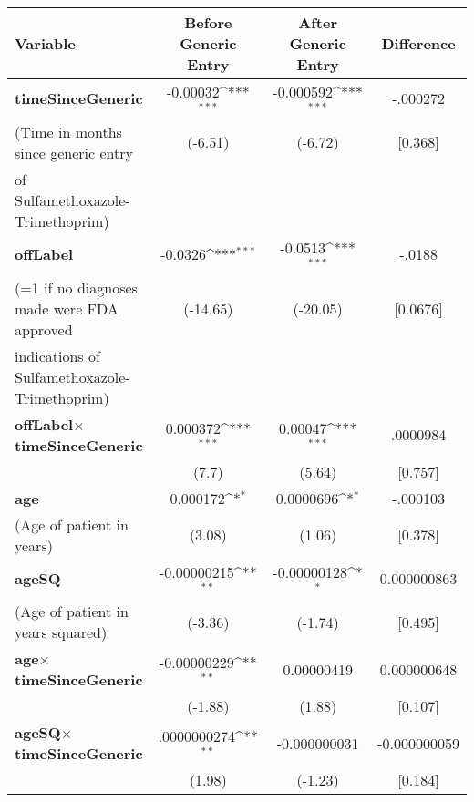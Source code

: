 \def\sym#1{\ifmmode^{#1}\else\(^{#1}\)\fi}
\begin{tabular}{l*{3}{c}}
\hline\hline
Variable            &\multicolumn{1}{c}{Before Generic Entry}&\multicolumn{1}{c}{After Generic Entry}&\multicolumn{1}{c}{Difference}\\
\hline
\textbf{timeSinceGeneric}&                           -0.00032\sym{***}&   -0.000592\sym{***}&   -.000272\\
(Time in months since generic entry            &     (-6.51)         &     (-6.72)         &     [0.368]         \\
of Sulfamethoxazole-Trimethoprim)\\
[.5em]
\textbf{offLabel}    &                                     -0.0326\sym{***}&     -0.0513\sym{***}&   -.0188\\
(=1 if no diagnoses made were FDA approved            &    (-14.65)         &    (-20.05)         &    [0.0676]         \\
indications of Sulfamethoxazole-Trimethoprim)\\
[.5em]
\textbf{offLabel}$\times$\textbf{timeSinceGeneric} &    0.000372\sym{***}&    0.00047\sym{***}&   .0000984\\
            &                                           (7.7)         &      (5.64)         &    [0.757]         \\
[.5em]
\textbf{age}         &                      0.000172\sym{*}  &    0.0000696\sym{*}  &   -.000103\\
(Age of patient in years)            &      (3.08)         &      (1.06)         &    [0.378]         \\
[.5em]
\textbf{ageSQ}       &                             -0.00000215\sym{**} & -0.00000128\sym{*}  &   0.000000863\\
(Age of patient in years squared)            &     (-3.36)         &     (-1.74)         &    [0.495]         \\
[.5em]
\textbf{age}$\times$\textbf{timeSinceGeneric}      & -0.00000229\sym{**} &  0.00000419         &   0.000000648\\
            &                                        (-1.88)         &      (1.88)         &    [0.107]         \\
[.5em]
\textbf{ageSQ}$\times$\textbf{timeSinceGeneric}    &    .0000000274\sym{**} &   -0.000000031         &   -0.000000059\\
            &                                           (1.98)         &     (-1.23)         &    [0.184]         \\

\end{tabular}
